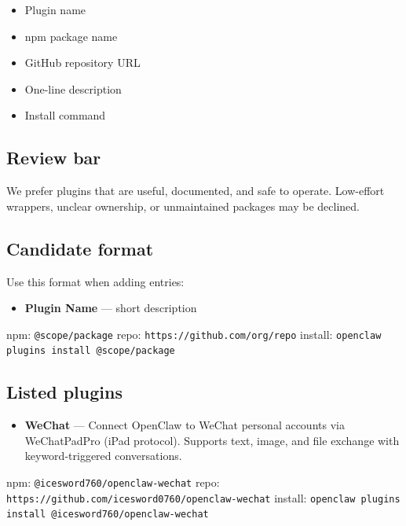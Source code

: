 \begin{itemize}
  \item Plugin name
  \item npm package name
  \item GitHub repository URL
  \item One-line description
  \item Install command
\end{itemize}


\subsection{Review bar}


We prefer plugins that are useful, documented, and safe to operate.
Low-effort wrappers, unclear ownership, or unmaintained packages may be declined.

\subsection{Candidate format}


Use this format when adding entries:

\begin{itemize}
  \item \textbf{Plugin Name} — short description
\end{itemize}

npm: \texttt{@scope/package}
repo: \texttt{https://github.com/org/repo}
install: \texttt{openclaw plugins install @scope/package}

\subsection{Listed plugins}


\begin{itemize}
  \item \textbf{WeChat} — Connect OpenClaw to WeChat personal accounts via WeChatPadPro (iPad protocol). Supports text, image, and file exchange with keyword-triggered conversations.
\end{itemize}

npm: \texttt{@icesword760/openclaw-wechat}
repo: \texttt{https://github.com/icesword0760/openclaw-wechat}
install: \texttt{openclaw plugins install @icesword760/openclaw-wechat}


\clearpage

